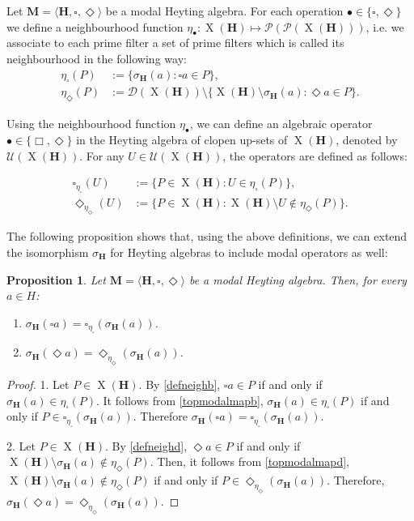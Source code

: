 \documentclass[pdflatex,sn-mathphys-num]{sn-jnl}%
\newcommand{\He}{\mathbf{H}}
\newcommand{\X}[1]{\operatorname{X}(#1)}
\theoremstyle{thmstyleone}%
\newtheorem{proposition}[theorem]{Proposition}%
\theoremstyle{thmstyletwo}%
\theoremstyle{thmstylethree}%
\begin{document}
Let $\mathbf{M}= \langle \He,\square , \Diamond\rangle$ be a modal Heyting algebra. 
For each operation $\bullet \in \{\square, \Diamond\}$ we define a neighbourhood function $\eta_\bullet : \X{\He}\mapsto \mathcal{P}(\mathcal{P}(\X{\He}))$, i.e. we associate to each prime filter a set of prime filters which is called its neighbourhood in the following way: 
\begin{align} \label{defneighb}
\eta_\square(P) &:=\{\sigma_\He(a) : \square a \in P \},\\ \label{defneighd}
\eta_\Diamond(P) &:=\mathcal{D}(\X{\He})\setminus\{ \X{\He}\setminus \sigma_\He(a) : \Diamond a \in P \}.
\end{align} 

Using the neighbourhood function $\eta_\bullet$, we can define an algebraic operator $\bullet \in \{\Box, \Diamond\}$ in the Heyting algebra of clopen up-sets of $\X{\He}$, denoted by $\mathcal{U}(\X{\He})$. For any $U \in \mathcal{U}(\X{\He})$, the operators are defined as follows:

\begin{align} 
\square_{\eta_\square}(U) &:= \{ P \in \X{\He} : U \in \eta_\square(P)\}, \label{topmodalmapb}\\
\Diamond_{\eta_\Diamond}(U) &:= \{ P \in \X{\He} : \X{\He}\setminus U \notin \eta_\Diamond(P)\}. \label{topmodalmapd}
\end{align}

The following proposition shows that, using the above definitions, we can extend the isomorphism $\sigma_\He$ for Heyting algebras to include modal operators as well:

\begin{proposition}
Let $\mathbf{M}= \langle \He,\square , \Diamond\rangle$ be a modal Heyting algebra. Then, for every $a \in H$: 
\begin{enumerate}
    \item $\sigma_\He({\square a}) = \square_{\eta_\square}(\sigma_\He(a))$.
    \item $\sigma_\He({\Diamond a}) = \Diamond_{\eta_\Diamond}(\sigma_\He(a))$.
\end{enumerate}
\end{proposition}
\begin{proof}

1. Let $P\in \X{\He}$. By \eqref{defneighb}, $\square a \in P$ if and only if $\sigma_\He(a) \in \eta_\square(P)$. It follows from \eqref{topmodalmapb}, $\sigma_\He(a) \in \eta_\square(P)$ if and only if $P \in \square_{\eta_\square}(\sigma_\He(a))$. Therefore $\sigma_\He({\square a}) = \square_{\eta_\square}(\sigma_\He(a))$.

2. Let $P\in \X{\He}$.  By \eqref{defneighd}, $\Diamond a \in P$ if and only if $\X{\He}\setminus \sigma_\He(a) \notin \eta_\Diamond(P)$. Then, it follows from \eqref{topmodalmapd}, $\X{\He}\setminus \sigma_\He(a) \notin \eta_\Diamond(P)$ if and only if $P\in \Diamond_{\eta_\Diamond}(\sigma_\He(a))$. Therefore, $\sigma_\He({\Diamond a}) = \Diamond_{\eta_\Diamond}(\sigma_\He(a))$.
\end{proof}
\end{document}
